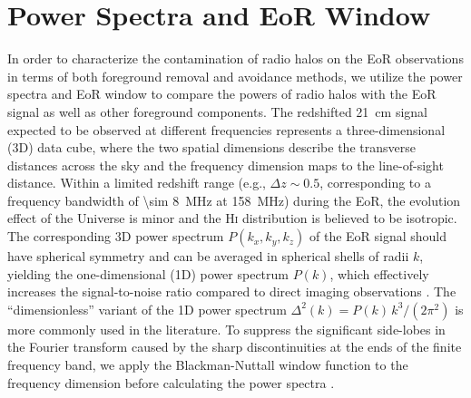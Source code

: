 \documentclass[twocolumn]{aastex62}
\newcommand{\Hi}{H\textsc{i}}
\begin{document}
\section{Power Spectra and EoR Window}
\label{sec:ps-eorw}

In order to characterize the contamination of radio halos on the EoR
observations in terms of both foreground removal and avoidance methods,
we utilize the power spectra and EoR window to compare the powers of
radio halos with the EoR signal as well as other foreground components.
The redshifted 21~cm signal expected to be observed at different
frequencies represents a three-dimensional (3D) data cube, where the
two spatial dimensions describe the transverse distances across the sky
and the frequency dimension maps to the line-of-sight distance.
Within a limited redshift range (e.g., $\Delta z \sim 0.5$, corresponding
to a frequency bandwidth of \SI{\sim 8}{\MHz} at \SI{158}{\MHz})
during the EoR, the evolution effect of the Universe is minor and the
\Hi{} distribution is believed to be isotropic.
The corresponding 3D power spectrum $P(k_x, k_y, k_z)$ of the EoR signal
should have spherical symmetry and can be averaged in spherical shells
of radii $k$, yielding the one-dimensional (1D) power spectrum $P(k)$,
which effectively increases the signal-to-noise ratio compared to
direct imaging observations \citep{morales2004,morales2006,datta2010}.
The \enquote{dimensionless} variant of the 1D power spectrum
$\Delta^2(k) = P(k) \,k^3 / (2\pi^2)$
is more commonly used in the literature.
To suppress the significant side-lobes in the Fourier transform caused
by the sharp discontinuities at the ends of the finite frequency band,
we apply the Blackman-Nuttall window function to the frequency dimension
before calculating the power spectra \citep[e.g.,][]{trott2015,chapman2016}.
\end{document}
